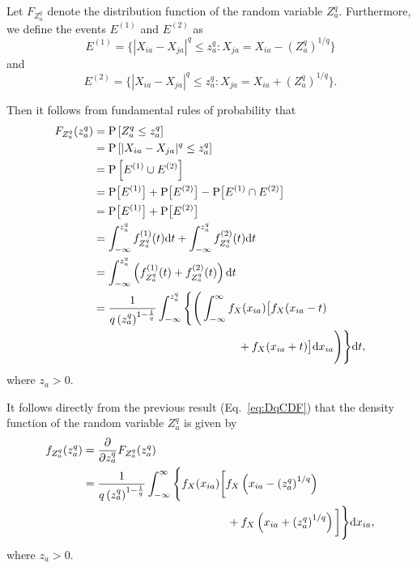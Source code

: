 \documentclass[aos]{imsart}
\begin{document}
Let $F_{Z^q_a}$ denote the distribution function of the random variable $Z^q_a$. Furthermore, we define the events $E^{(1)}$ and $E^{(2)}$ as
%
\begin{equation}\label{eq:E(1)}
E^{(1)} = \bigl\{|X_{ia}-X_{ja}|^q \leq z^q_a : X_{ja} = X_{ia} - \left(Z^q_a\right)^{1/q}\bigr\}
\end{equation}
%
and
%
\begin{equation}\label{eq:E(2)}
E^{(2)} = \bigl\{|X_{ia}-X_{ja}|^q \leq z^q_a : X_{ja} = X_{ia} + \left(Z^q_a\right)^{1/q}\bigr\}.
\end{equation}

Then it follows from fundamental rules of probability that
%
\begin{equation}\label{eq:DqCDF}
\begin{aligned}
F_{Z^q_a}(z^q_a) &= \text{P}\left[Z^q_a \leq z^q_a\right] \\
&= \text{P}\left[|X_{ia} - X_{ja}|^q \leq z^q_a\right] \\
&= \text{P}\left[E^{(1)} \cup E^{(2)}\right] \\
&= \text{P}\bigl[E^{(1)}\bigr] + \text{P}\bigl[E^{(2)}\bigr] - \text{P}\bigl[E^{(1)} \cap E^{(2)}\bigr] \\
&= \text{P}\bigl[E^{(1)}\bigr] + \text{P}\bigl[E^{(2)}\bigr] \\
&= \int_{-\infty}^{z^q_a} f^{(1)}_{Z^q_a}(t) \text{d}t + \int_{-\infty}^{z^q_a} f^{(2)}_{Z^q_a}(t) \text{d}t \\
&= \int_{-\infty}^{z^q_a} \left(f^{(1)}_{Z^q_a}(t) + f^{(2)}_{Z^q_a}(t)\right) \text{d}t \\
&= \frac{1}{q \left(z^q_a\right)^{1 - \frac{1}{q}}} \int_{-\infty}^{z^q_a} {\Biggl \{}{\Biggl(}\int_{-\infty}^{\infty}f_X(x_{ia}){\bigl[}f_X(x_{ia} - t) \\
&\hspace{4.5cm}+ f_X(x_{ia} + t){\bigr]} \text{d}x_{ia}{\Biggr)}{\Biggr\}}\text{d}t,
\end{aligned}
\end{equation}
%
where $z_a > 0$.

It follows directly from the previous result (Eq.~\ref{eq:DqCDF}) that the density function of the random variable $Z^q_a$ is given by
%
\begin{equation}\label{eq:DqPDF}
\begin{aligned}
f_{Z^q_a}(z^q_a) &= \frac{\partial}{\partial z^q_a} F_{Z^q_a}(z^q_a) \\
&= \frac{1}{q \left(z^q_a\right)^{1 - \frac{1}{q}}}\int_{-\infty}^{\infty} {\Biggl\{}f_X(x_{ia}){\biggl[}f_X\left(x_{ia} - \left(z^q_a\right)^{1/q}\right) \\
&\hspace{4.5cm}+ f_X\left(x_{ia} + \left(z^q_a\right)^{1/q}\right){\biggr]}{\Biggr\}} \text{d}x_{ia},
\end{aligned}
\end{equation}
%
where $z_a > 0$.
\end{document}
